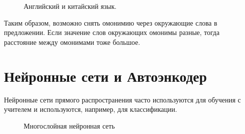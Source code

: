 \documentclass[12pt]{article}
\begin{document}
 	\begin{figure}[h]
		\noindent{}
		\caption{Английский и китайский язык.}
		\label{figCurves}
	\end{figure}

	

Таким образом, возможно снять омонимию через окружающие слова в предложении. Если значение слов окружающих омонимы разные, тогда расстояние между омонимами тоже большое.

\section{Нейронные сети и Автоэнкодер}

Нейронные сети прямого распространения часто используются для обучения с учителем и используются, например, для классификации.

  \begin{figure}[h]
    \noindent{}
    \caption{Многослойная нейронная сеть}
    \label{figCurves}
  \end{figure}
\end{document}
